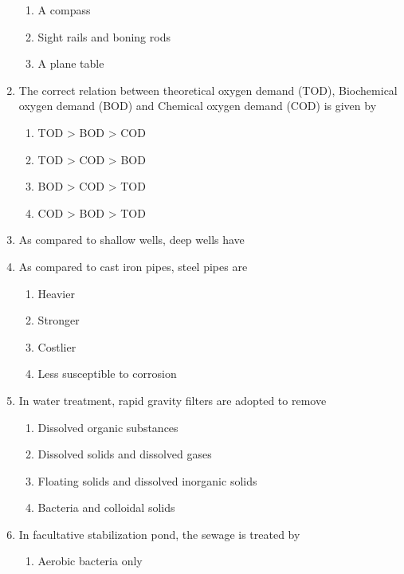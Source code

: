 \documentclass[11pt,a4paper]{article}
\begin{document}
\begin{enumerate}
\begin{enumerate}[label=\Alph*.]
\item{A compass}
\item{Sight rails and boning rods}
\item{A plane table}
\end{enumerate}
\item{The correct relation between theoretical oxygen demand (TOD), Biochemical oxygen demand (BOD) and Chemical oxygen demand (COD) is given by}
\begin{enumerate}[label=\Alph*.]
\item{TOD > BOD > COD}
\item{TOD > COD > BOD}
\item{BOD > COD > TOD}
\item{COD > BOD > TOD}
\end{enumerate}
\item{As compared to shallow wells, deep wells have}
\\
\item{As compared to cast iron pipes, steel pipes are}
\begin{enumerate}[label=\Alph*.]
\item{Heavier}
\item{Stronger}
\item{Costlier}
\item{Less susceptible to corrosion}
\end{enumerate}
\item{In water treatment, rapid gravity filters are adopted to remove}
\begin{enumerate}[label=\Alph*.]
\item{Dissolved organic substances}
\item{Dissolved solids and dissolved gases}
\item{Floating solids and dissolved inorganic solids}
\item{Bacteria and colloidal solids}
\end{enumerate}
\item{In facultative stabilization pond, the sewage is treated by}
\begin{enumerate}[label=\Alph*.]
\item{Aerobic bacteria only}

\end{enumerate}
\end{enumerate}
\end{document}
